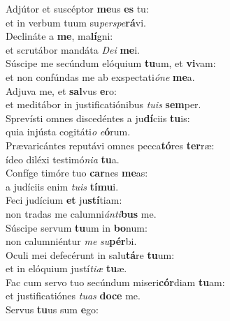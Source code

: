 \evenverse Adjútor et suscéptor \textbf{me}us \textbf{es} tu:~\*\\
\evenverse et in verbum tuum su\textit{per}\textit{spe}\textbf{rá}vi.\\
\oddverse Declináte a \textbf{me}, ma\textbf{lí}gni:~\*\\
\oddverse et scrutábor mandáta \textit{De}\textit{i} \textbf{me}i.\\
\evenverse Súscipe me secúndum elóquium \textbf{tu}um, et \textbf{vi}vam:~\*\\
\evenverse et non confúndas me ab exspectati\textit{ó}\textit{ne} \textbf{me}a.\\
\oddverse Adjuva me, et \textbf{sal}vus \textbf{e}ro:~\*\\
\oddverse et meditábor in justificatiónibus \textit{tu}\textit{is} \textbf{sem}per.\\
\evenverse Sprevísti omnes discedéntes a ju\textbf{dí}ciis \textbf{tu}is:~\*\\
\evenverse quia injústa cogitáti\textit{o} \textit{e}\textbf{ó}rum.\\
\oddverse Prævaricántes reputávi omnes pecca\textbf{tó}res \textbf{ter}ræ:~\*\\
\oddverse ídeo diléxi testimó\textit{ni}\textit{a} \textbf{tu}a.\\
\evenverse Confíge timóre tuo \textbf{car}nes \textbf{me}as:~\*\\
\evenverse a judíciis enim \textit{tu}\textit{is} \textbf{tí}\textbf{mu}i.\\
\oddverse Feci judícium \textbf{et} ju\textbf{stí}tiam:~\*\\
\oddverse non tradas me calumni\textit{án}\textit{ti}\textbf{bus} me.\\
\evenverse Súscipe servum \textbf{tu}um in \textbf{bo}num:~\*\\
\evenverse non calumniéntur \textit{me} \textit{su}\textbf{pér}bi.\\
\oddverse Oculi mei defecérunt in salu\textbf{tá}re \textbf{tu}um:~\*\\
\oddverse et in elóquium justí\textit{ti}\textit{æ} \textbf{tu}æ.\\
\evenverse Fac cum servo tuo secúndum miseri\textbf{cór}diam \textbf{tu}am:~\*\\
\evenverse et justificatiónes \textit{tu}\textit{as} \textbf{do}\textbf{ce} me.\\
\oddverse Servus \textbf{tu}us sum \textbf{e}go:~\*\\
